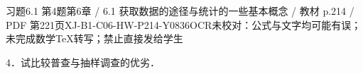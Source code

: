 \begin{bankitem}{习题6.1 第4题}{第6章 / 6.1 获取数据的途径与统计的一些基本概念 / 教材 p.214 / PDF 第221页}{XJ-B1-C06-HW-P214-Y0836}{OCR未校对：公式与文字均可能有误；未完成数学TeX转写；禁止直接发给学生}
\begin{ocrdraft}
\par
4．试比较普查与抽样调查的优劣．
\end{ocrdraft}
\end{bankitem}

